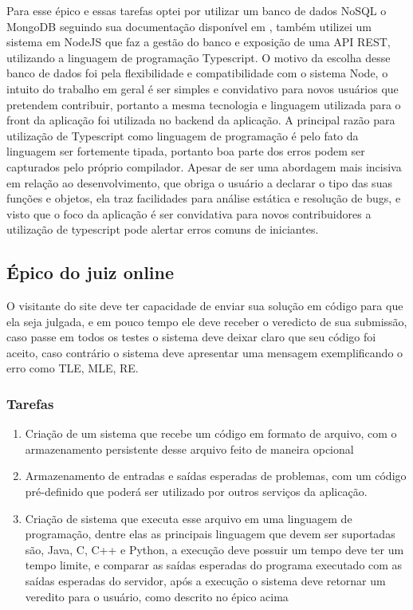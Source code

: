 Para esse épico e essas tarefas optei por utilizar um banco de dados NoSQL o MongoDB seguindo sua 
documentação disponível em \cite{doc:mongodb}, também utilizei um sistema em NodeJS que faz a 
gestão do banco e exposição de uma API REST, utilizando a linguagem de programação Typescript.
O motivo da escolha desse banco de dados foi pela flexibilidade e compatibilidade com o sistema 
Node, o intuito do trabalho em geral é ser simples e convidativo para novos usuários que pretendem 
contribuir, portanto a mesma tecnologia e linguagem utilizada para o front da aplicação foi 
utilizada no backend da aplicação.
A principal razão para utilização de Typescript como linguagem de programação é pelo fato da 
linguagem ser fortemente tipada, portanto boa parte dos erros podem ser capturados pelo próprio 
compilador. Apesar de ser uma abordagem mais incisiva em relação ao desenvolvimento, que obriga o 
usuário a declarar o tipo das suas funções e objetos, ela traz facilidades para análise estática e 
resolução de bugs, e visto que o foco da aplicação é ser convidativa para novos contribuidores a 
utilização de typescript pode alertar erros comuns de iniciantes.

\subsection{Épico do juiz online}

O visitante do site deve ter capacidade de enviar sua solução em código para que ela seja julgada, 
e em pouco tempo ele deve receber o veredicto de sua submissão, caso passe em todos os testes o 
sistema deve deixar claro que seu código foi aceito, caso contrário o sistema deve apresentar uma 
mensagem exemplificando o erro como TLE, MLE, RE.

\subsubsection{Tarefas}
\begin{enumerate}
    \item Criação de um sistema que recebe um código em formato de arquivo, com o armazenamento 
    persistente desse arquivo feito de maneira opcional
    \item Armazenamento de entradas e saídas esperadas de problemas, com um código pré-definido que 
    poderá ser utilizado por outros serviços da aplicação.
    \item Criação de sistema que executa esse arquivo em uma linguagem de programação, dentre elas 
    as principais linguagem que devem ser suportadas são, Java, C, C++ e Python, a execução deve 
    possuir um tempo deve ter um tempo limite, e comparar as saídas esperadas do programa executado 
    com as saídas esperadas do servidor, após a execução o sistema deve retornar um veredito para o 
    usuário, como descrito no épico acima
\end{enumerate}

